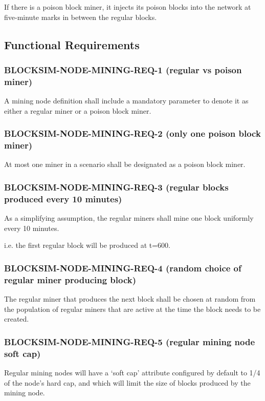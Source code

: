 \documentclass{scrreprt}
\begin{document}
If there is a poison block miner, it injects its poison blocks into the network
at five-minute marks in between the regular blocks.


\subsection{Functional Requirements}


\subsubsection{BLOCKSIM-NODE-MINING-REQ-1 (regular vs poison miner)}

A mining node definition shall include a mandatory parameter to denote
it as either a regular miner or a poison block miner.

\subsubsection{BLOCKSIM-NODE-MINING-REQ-2 (only one poison block miner)}

At most one miner in a scenario shall be designated as a poison block
miner.

\subsubsection{BLOCKSIM-NODE-MINING-REQ-3 (regular blocks produced every 10 minutes)}

As a simplifying assumption, the regular miners shall mine one block uniformly
every 10 minutes.

i.e. the first regular block will be produced at t=600.

\subsubsection{BLOCKSIM-NODE-MINING-REQ-4 (random choice of regular miner producing block)}

The regular miner that produces the next block shall be chosen at random
from the population of regular miners that are active at the time the block
needs to be created.


\subsubsection{BLOCKSIM-NODE-MINING-REQ-5 (regular mining node soft cap)}

Regular mining nodes will have a `soft cap' attribute configured by default to
1/4 of the node's hard cap, and which will limit the size of blocks produced
by the mining node.
\end{document}
